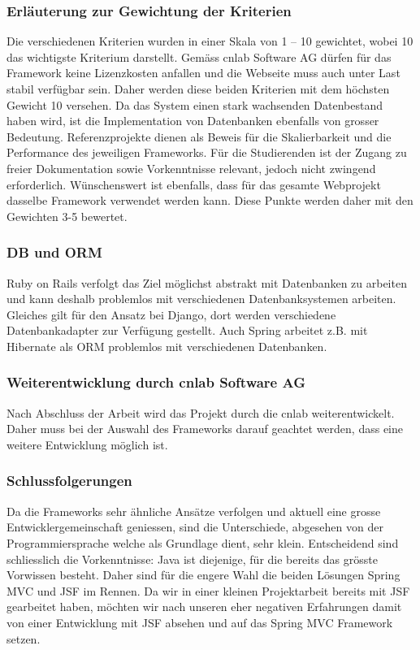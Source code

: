\subsubsection{Erläuterung zur Gewichtung der Kriterien}
Die verschiedenen Kriterien wurden in einer Skala von 1 – 10 gewichtet, wobei 10 das wichtigste Kriterium darstellt. Gemäss cnlab Software AG dürfen für das Framework keine Lizenzkosten anfallen und die Webseite muss auch unter Last stabil verfügbar sein. Daher werden diese beiden Kriterien mit dem höchsten Gewicht 10 versehen.
Da das System einen stark wachsenden Datenbestand haben wird, ist die Implementation von Datenbanken ebenfalls von grosser Bedeutung. Referenzprojekte dienen als Beweis für die Skalierbarkeit und die Performance des jeweiligen Frameworks.
Für die Studierenden ist der Zugang zu freier Dokumentation sowie Vorkenntnisse relevant, jedoch nicht zwingend erforderlich. Wünschenswert ist ebenfalls, dass für das gesamte Webprojekt dasselbe Framework verwendet werden kann. Diese Punkte werden daher mit den Gewichten 3-5 bewertet.
\subsubsection{DB und ORM}
Ruby on Rails verfolgt das Ziel möglichst abstrakt mit Datenbanken zu arbeiten und kann deshalb problemlos mit verschiedenen Datenbanksystemen arbeiten. Gleiches gilt für den Ansatz bei Django, dort werden verschiedene Datenbankadapter zur Verfügung gestellt. Auch Spring arbeitet z.B. mit Hibernate als ORM problemlos mit verschiedenen Datenbanken.
\subsubsection{Weiterentwicklung durch cnlab Software AG}
Nach Abschluss der Arbeit wird das Projekt durch die cnlab weiterentwickelt. Daher muss bei der Auswahl des Frameworks darauf geachtet werden, dass eine weitere Entwicklung möglich ist.
\subsubsection{Schlussfolgerungen}
Da die Frameworks sehr ähnliche Ansätze verfolgen und aktuell eine grosse Entwicklergemeinschaft geniessen, sind die Unterschiede, abgesehen von der Programmiersprache welche als Grundlage dient, sehr klein. Entscheidend sind schliesslich die Vorkenntnisse: Java ist diejenige, für die bereits das grösste Vorwissen besteht. Daher sind für die engere Wahl die beiden Lösungen Spring MVC und JSF im Rennen. Da wir in einer kleinen Projektarbeit bereits mit JSF gearbeitet haben, möchten wir nach unseren eher negativen Erfahrungen damit von einer Entwicklung mit JSF absehen und auf das Spring MVC Framework setzen.

